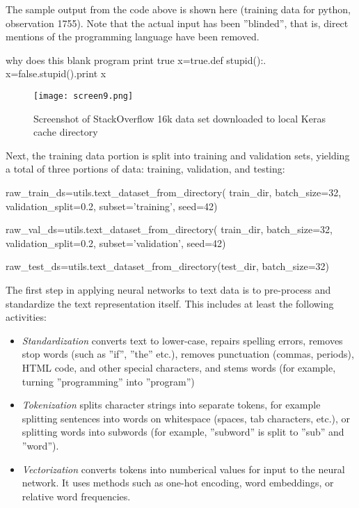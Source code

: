 The sample output from the code above is shown here (training data for python, observation 1755). Note that the actual input has been ''blinded'', that is, direct mentions of the programming language have been removed.

\begin{samepage}
\begin{textcode}
why does this blank program print true x=true.def stupid():.
x=false.stupid().print x
\end{textcode}
\end{samepage}

\begin{figure}
\centering

\texttt{[image: screen9.png]}
\caption[StackOverflow dataset in Keras cache directory]{Screenshot of StackOverflow 16k data set downloaded to local Keras cache directory}
\label{fig:screen9_chap16}
\end{figure}

Next, the training data portion is split into training and validation sets, yielding a total of three portions of data: training, validation, and testing:

\begin{samepage}
\begin{pythoncode}
raw_train_ds=utils.text_dataset_from_directory(
    train_dir, batch_size=32, validation_split=0.2,
    subset='training', seed=42)

raw_val_ds=utils.text_dataset_from_directory(
    train_dir, batch_size=32, validation_split=0.2,
    subset='validation', seed=42)

raw_test_ds=utils.text_dataset_from_directory(test_dir, batch_size=32)
\end{pythoncode}
\end{samepage}

The first step in applying neural networks to text data is to pre-process and standardize the text representation itself. This includes at least the following activities:

\begin{itemize}
   \item \emph{Standardization} converts text to lower-case, repairs spelling errors, removes stop words (such as ''if'', ''the'' etc.), removes punctuation (commas, periods), HTML code, and other special characters, and stems words (for example, turning ''programming'' into ''program'')
   \item \emph{Tokenization} splits character strings into separate tokens, for example splitting sentences into words on whitespace (spaces, tab characters, etc.), or splitting words into subwords (for example, ''subword'' is split to ''sub'' and ''word'').
   \item \emph{Vectorization} converts tokens into numberical values for input to the neural network. It uses methods such as one-hot encoding, word embeddings, or relative word frequencies.
\end{itemize}

